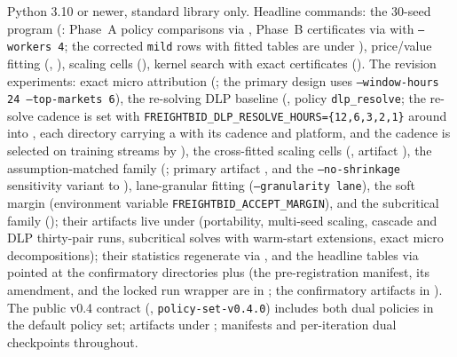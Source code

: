 \documentclass[11pt]{article}
\begin{document}
Python 3.10 or newer, standard library only. Headline commands: the
30-seed program (: Phase~A policy
comparisons via , Phase~B
certificates via  with
\texttt{--workers 4}; the corrected \texttt{mild} rows with fitted
tables are under ), price/value fitting
(, ),
scaling cells (),
kernel search with exact certificates
(). The revision experiments: exact
micro attribution (; the primary
design uses \texttt{--window-hours 24 --top-markets 6}), the
re-solving DLP baseline (, policy
\texttt{dlp\_resolve}; the re-solve cadence is set with
\texttt{FREIGHTBID\_DLP\_RESOLVE\_HOURS=\{12,6,3,2,1\}} around
 into
, each
directory carrying a  with its cadence and
platform, and the cadence is selected on training streams by
), the cross-fitted scaling cells
(, artifact
), the
assumption-matched family
(; primary artifact
, and the
\texttt{--no-shrinkage} sensitivity variant to
),
lane-granular fitting
(\texttt{--granularity lane}), the soft margin (environment variable
\texttt{FREIGHTBID\_ACCEPT\_MARGIN}), and the subcritical family
(); their
artifacts live under  (portability,
multi-seed scaling, cascade and DLP thirty-pair runs, subcritical
solves with warm-start extensions, exact micro decompositions);
their statistics regenerate via
, and the headline tables via
 pointed at the confirmatory
directories plus  (the
pre-registration manifest, its amendment, and the locked run wrapper
are in ; the
confirmatory artifacts in ). The
public v0.4 contract
(,
\texttt{policy-set-v0.4.0}) includes both dual policies in the default
policy set; artifacts under ; manifests
and per-iteration dual checkpoints throughout.



\end{document}
